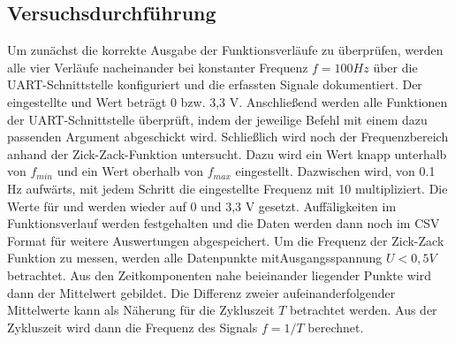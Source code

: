 \subsection{Versuchsdurchführung}
Um zunächst die korrekte Ausgabe der Funktionsverläufe zu überprüfen, werden alle vier Verläufe nacheinander bei konstanter Frequenz $f=100Hz$ über die UART-Schnittstelle konfiguriert und die erfassten Signale dokumentiert.
Der eingestellte  und  Wert beträgt 0 bzw. 3,3 V.
Anschließend werden alle Funktionen der UART-Schnittstelle überprüft, indem der jeweilige Befehl mit einem dazu passenden Argument abgeschickt wird.
Schließlich wird noch der Frequenzbereich anhand der Zick-Zack-Funktion untersucht.
Dazu wird ein Wert knapp unterhalb von $f_{min}$ und ein Wert oberhalb von $f_{max}$ eingestellt.
Dazwischen wird, von 0.1 Hz aufwärts, mit jedem Schritt die eingestellte Frequenz mit 10 multipliziert.
Die Werte für  und  werden wieder auf 0 und 3,3 V gesetzt.
Auffäligkeiten im Funktionsverlauf werden festgehalten und die Daten werden dann noch im CSV Format für weitere Auswertungen abgespeichert.
Um die Frequenz der Zick-Zack Funktion zu messen, werden alle Datenpunkte mitAusgangsspannung $U < 0,5 V$ betrachtet.
Aus den Zeitkomponenten nahe beieinander liegender Punkte wird dann der Mittelwert gebildet.
Die Differenz zweier aufeinanderfolgender Mittelwerte kann als Näherung für die Zykluszeit $T$ betrachtet werden.
Aus der Zykluszeit wird dann die Frequenz des Signals $f = 1 / T$ berechnet.


